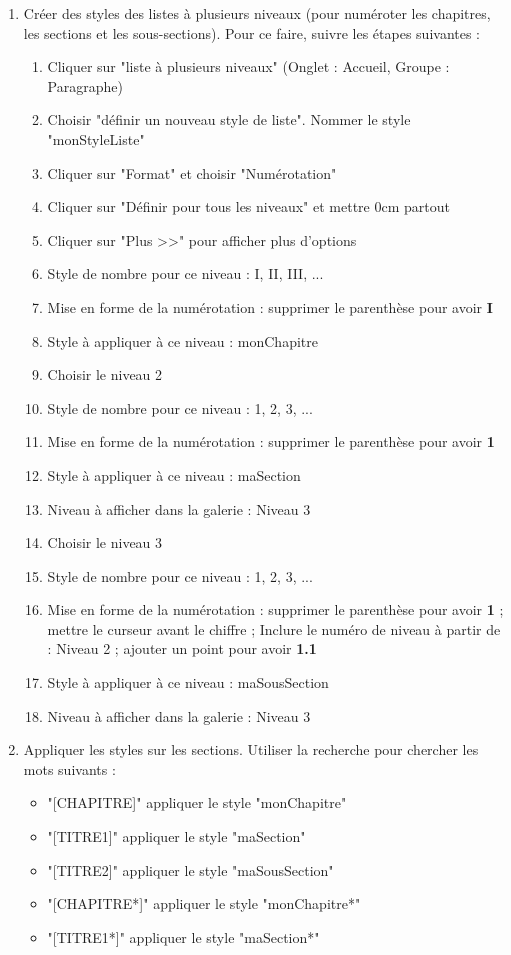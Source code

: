 \documentclass[11pt, a4paper]{article}
\begin{document}
\begin{enumerate}
	\item Créer des styles des listes à plusieurs niveaux (pour numéroter les chapitres, les sections et les sous-sections). Pour ce faire, suivre les étapes suivantes : 
	\begin{multicols}{2}
	\begin{enumerate}
		\item Cliquer sur "liste à plusieurs niveaux" (Onglet : Accueil, Groupe : Paragraphe)
		\item Choisir "définir un nouveau style de liste". Nommer le style "monStyleListe"
		\item Cliquer sur "Format" et choisir "Numérotation"
		\item Cliquer sur "Définir pour tous les niveaux" et mettre 0cm partout
		\item Cliquer sur "Plus \textgreater \textgreater" pour afficher plus d'options
		\item Style de nombre pour ce niveau : I, II, III, ...
		\item Mise en forme de la numérotation : supprimer le parenthèse pour avoir \textbf{I}
		\item Style à appliquer à ce niveau : monChapitre
		\item Choisir le niveau 2
		\item Style de nombre pour ce niveau : 1, 2, 3, ...
		\item Mise en forme de la numérotation : supprimer le parenthèse pour avoir \textbf{1}
		\item Style à appliquer à ce niveau : maSection
		\item Niveau à afficher dans la galerie : Niveau 3
		\item Choisir le niveau 3
		\item Style de nombre pour ce niveau : 1, 2, 3, ...
		\item Mise en forme de la numérotation : supprimer le parenthèse pour avoir \textbf{1} ; mettre le curseur avant le chiffre ; Inclure le numéro de niveau à partir de : Niveau 2 ; ajouter un point pour avoir \textbf{1.1}
		\item Style à appliquer à ce niveau : maSousSection
		\item Niveau à afficher dans la galerie : Niveau 3
	\end{enumerate}
	\end{multicols}

	\item Appliquer les styles sur les sections. Utiliser la recherche pour chercher les mots suivants : 
	\begin{multicols}{2}
	\begin{itemize}
		\item "[CHAPITRE]" appliquer le style "monChapitre"
		\item "[TITRE1]" appliquer le style "maSection"
		\item "[TITRE2]" appliquer le style "maSousSection"
		\item "[CHAPITRE*]" appliquer le style "monChapitre*"
		\item "[TITRE1*]" appliquer le style "maSection*"
	\end{itemize}
	\end{multicols}
	

\end{enumerate}
\end{document}
